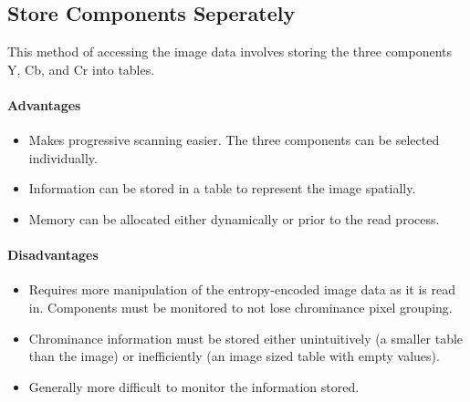 \subsection{Store Components Seperately}

This method of accessing the image data involves storing the three components Y, Cb, and Cr into tables.

\paragraph*{Advantages}
\begin{itemize}
	\item Makes progressive scanning easier. The three components can be selected individually.
	\item Information can be stored in a table to represent the image spatially.
	\item Memory can be allocated either dynamically or prior to the read process.
\end{itemize}

\paragraph*{Disadvantages}
\begin{itemize}
	\item Requires more manipulation of the entropy-encoded image data as it is read in. 
		Components must be monitored to not lose chrominance pixel grouping.
	\item Chrominance information must be stored either unintuitively (a smaller table than the image) or 
		inefficiently (an image sized table with empty values).
	\item Generally more difficult to monitor the information stored.
\end{itemize}